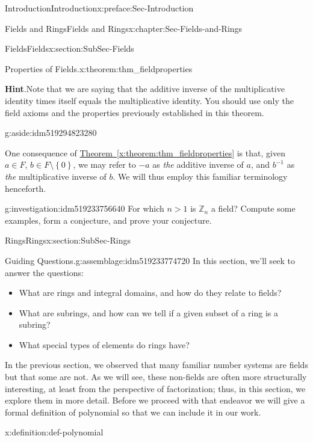\documentclass[oneside,10pt,]{book}
\newcommand{\blocktitlefont}{\relax}
\newcommand{\xreffont}{\relax}
\numberwithin{equation}{section}
\newcommand{\set}[1]{\left\{ {#1} \right\}}
\def\Z{{\mathbb Z}}
\begin{document}
\begin{preface}{Introduction}{}{Introduction}{}{}{x:preface:Sec-Introduction}
\begin{chapterptx}{Fields and Rings}{}{Fields and Rings}{}{}{x:chapter:Sec-Fields-and-Rings}
\begin{sectionptx}{Fields}{}{Fields}{}{}{x:section:SubSec-Fields}
\begin{theorem}{Properties of Fields.}{}{x:theorem:thm_fieldproperties}
\begin{enumerate}
\textbf{\blocktitlefont Hint}.\quad{}Note that we are saying that the additive inverse of the multiplicative identity times itself equals the multiplicative identity. You should use only the field axioms and the properties previously established in this theorem.%
\begin{aside}{}{g:aside:idm519294823280}%
\end{aside}
%
\end{enumerate}
%
\end{theorem}
One consequence of \hyperref[x:theorem:thm_fieldproperties]{Theorem~{\xreffont\ref{x:theorem:thm_fieldproperties}}} is that, given \(a\in F\), \(b\in F\setminus \set{0}\), we may refer to \(-a\) as \emph{the} additive inverse of \(a\), and \(b^{-1}\) as \emph{the} multiplicative inverse of \(b\). We will thus employ this familiar terminology henceforth.%
\begin{investigation}{}{g:investigation:idm519233756640}%
For which \(n > 1\) is \(\Z_n\) a field? Compute some examples, form a conjecture, and prove your conjecture.%
\end{investigation}
\end{sectionptx}
%
%
\typeout{************************************************}
\typeout{************************************************}
%
\begin{sectionptx}{Rings}{}{Rings}{}{}{x:section:SubSec-Rings}
\begin{assemblage}{Guiding Questions.}{g:assemblage:idm519233774720}%
In this section, we'll seek to answer the questions: %
\begin{itemize}[label=\textbullet]
\item{}What are rings and integral domains, and how do they relate to fields?%
\item{}What are subrings, and how can we tell if a given subset of a ring is a subring?%
\item{}What special types of elements do rings have?%
\end{itemize}
%
\end{assemblage}
In the previous section, we observed that many familiar number systems are fields but that some are not. As we will see, these non-fields are often more structurally interesting, at least from the perspective of factorization; thus, in this section, we explore them in more detail. Before we proceed with that endeavor we will give a formal definition of polynomial so that we can include it in our work.%
\begin{definition}{}{x:definition:def-polynomial}%

\end{definition}
\end{sectionptx}
\end{chapterptx}
\end{preface}
\end{document}
